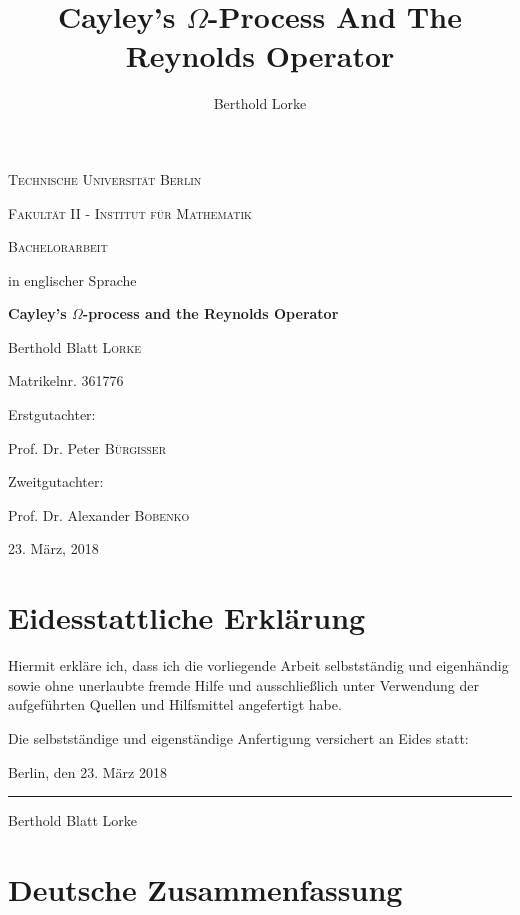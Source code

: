 \documentclass[a4paper]{article}
\title{Cayley's $\Omega$-Process And The Reynolds Operator}
\author{Berthold Lorke}
\theoremstyle{prrt}
\begin{document}


\begin{titlepage}
  \centering
  {\scshape\LARGE Technische Universit\"at Berlin\par}
  \vspace{0.5cm}
  {\scshape\LARGE Fakult\"at II - Institut f\"ur Mathematik\par}
  \vspace{1cm}
  {\scshape\Large Bachelorarbeit\par}
  \vspace{0.5cm}
  {in englischer Sprache\par}
  \vspace{1.5cm}
  {\huge\bfseries Cayley's $\Omega$-process and the Reynolds Operator\par}
  \vspace{2cm}
  {\Large Berthold Blatt \textsc{Lorke}\par}
  {\Large Matrikelnr. 361776\par}
  \vfill
  Erstgutachter:\par
  Prof. Dr. Peter \textsc{B\"urgisser}\par
  Zweitgutachter:\par
  Prof. Dr. Alexander \textsc{Bobenko}\par
  \vfill

  {\large 23. M\"arz, 2018 \par}
\end{titlepage}

\section*{Eidesstattliche Erkl\"arung}

Hiermit erkl\"are ich, dass ich die vorliegende Arbeit selbstst\"andig und eigenh\"andig sowie ohne unerlaubte fremde Hilfe und ausschlie{\ss}lich unter Verwendung der aufgef\"uhrten Quellen und Hilfsmittel angefertigt habe.

\vspace{4cm}
\noindent Die selbstst\"andige und eigenst\"andige Anfertigung versichert an Eides statt:

\vspace{2cm}
\noindent Berlin, den 23. M\"arz 2018

\vspace{1cm}
\noindent \rule{5cm}{0.4pt}

\noindent Berthold Blatt Lorke
\newpage
\section*{Deutsche Zusammenfassung}
\end{document}
